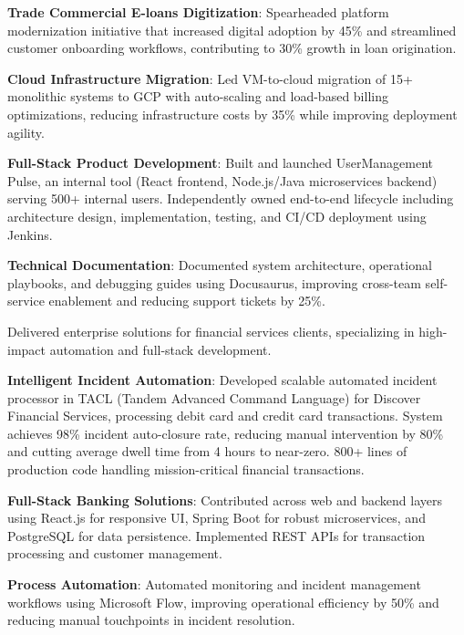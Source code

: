 \documentclass[]{hanisntsolo-resume}
\begin{document}
\begin{tightemize}
\item \textbf{Trade Commercial E-loans Digitization}: Spearheaded platform modernization initiative that increased digital adoption by 45\% and streamlined customer onboarding workflows, contributing to 30\% growth in loan origination.

\item \textbf{Cloud Infrastructure Migration}: Led VM-to-cloud migration of 15+ monolithic systems to GCP with auto-scaling and load-based billing optimizations, reducing infrastructure costs by 35\% while improving deployment agility.

\item \textbf{Full-Stack Product Development}: Built and launched UserManagement Pulse, an internal tool (React frontend, Node.js/Java microservices backend) serving 500+ internal users. Independently owned end-to-end lifecycle including architecture design, implementation, testing, and CI/CD deployment using Jenkins.

\item \textbf{Technical Documentation}: Documented system architecture, operational playbooks, and debugging guides using Docusaurus, improving cross-team self-service enablement and reducing support tickets by 25\%.

\end{tightemize}

\sectionsep


Delivered enterprise solutions for financial services clients, specializing in high-impact automation and full-stack development.

\begin{tightemize}

\item \textbf{Intelligent Incident Automation}: Developed scalable automated incident processor in TACL (Tandem Advanced Command Language) for Discover Financial Services, processing debit card and credit card transactions. System achieves 98\% incident auto-closure rate, reducing manual intervention by 80\% and cutting average dwell time from 4 hours to near-zero. 800+ lines of production code handling mission-critical financial transactions.

\item \textbf{Full-Stack Banking Solutions}: Contributed across web and backend layers using React.js for responsive UI, Spring Boot for robust microservices, and PostgreSQL for data persistence. Implemented REST APIs for transaction processing and customer management.

\item \textbf{Process Automation}: Automated monitoring and incident management workflows using Microsoft Flow, improving operational efficiency by 50\% and reducing manual touchpoints in incident resolution.

\end{tightemize}
\end{document}
